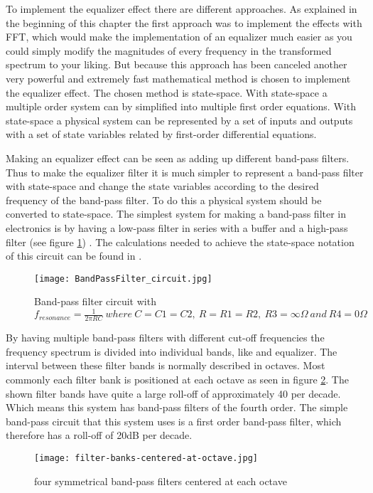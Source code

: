 To implement the equalizer effect there are different approaches. As explained in the beginning of this chapter the first approach was to implement the effects with FFT, which would make the implementation of an equalizer much easier as you could simply modify the magnitudes of every frequency in the transformed spectrum to your liking. But because this approach has been canceled another very powerful and extremely fast mathematical method is chosen to implement the equalizer effect. The chosen method is state-space. With state-space a multiple order system can by simplified into multiple first order equations. With state-space a physical system can be represented by a set of inputs and outputs with a set of state variables related by first-order differential equations. 

Making an equalizer effect can be seen as adding up different band-pass filters. Thus to make the equalizer filter it is much simpler to represent a band-pass filter with state-space and change the state variables according to the desired frequency of the band-pass filter. To do this a physical system should be converted to state-space. The simplest system for making a band-pass filter in electronics is by having a low-pass filter in series with a buffer and a high-pass filter (see figure \ref{fig:bpf-circuit}) \cite{electronic_tutorial_bpf}. The calculations needed to achieve the state-space notation of this circuit can be found in .

\begin{figure}[ht]
    \texttt{[image: BandPassFilter\_circuit.jpg]}
    \caption{Band-pass filter circuit with $f_{resonance}=\frac{1}{2\pi RC}\ where\ C=C1=C2,\ R=R1=R2,\ R3=\infty\Omega\ and\ R4=0\Omega$}
    \label{fig:bpf-circuit}
\end{figure}

By having multiple band-pass filters with different cut-off frequencies the frequency spectrum is divided into individual bands, like and equalizer. The interval between these filter bands is normally described in octaves. Most commonly each filter bank is positioned at each octave as seen in figure \ref{fig:filter-banks-octave}. The shown filter bands have quite a large roll-off of approximately 40 per decade. Which means this system has band-pass filters of the fourth order. The simple band-pass circuit that this system uses is a first order band-pass filter, which therefore has a roll-off of 20dB per decade. 

\begin{figure}[ht]
    \texttt{[image: filter-banks-centered-at-octave.jpg]}
    \caption{four symmetrical band-pass filters centered at each octave \cite{Blateyronbpf}}
    \label{fig:filter-banks-octave}
\end{figure}

